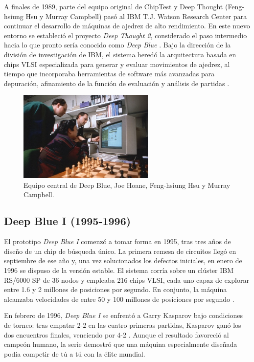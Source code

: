 \documentclass[a4paper, 12pt]{article}
\begin{document}
A finales de 1989, parte del equipo original de ChipTest y Deep 
Thought (Feng-hsiung Hsu y Murray Campbell) pasó al IBM T.J. 
Watson Research Center para continuar el desarrollo de máquinas 
de ajedrez de alto rendimiento. En este nuevo entorno se 
estableció el proyecto \textit{Deep Thought 2}, considerado el 
paso intermedio hacia lo que pronto sería conocido como 
\textit{Deep Blue} \cite{Campbell2002}. Bajo la dirección de la 
división de investigación de IBM, el sistema heredó la 
arquitectura basada en chips VLSI especializada para generar y 
evaluar movimientos de ajedrez, al tiempo que incorporaba 
herramientas de software más avanzadas para depuración, 
afinamiento de la función de evaluación y análisis de partidas 
\cite{Campbell2002}.

\begin{figure}[h]
    \centering
    \includegraphics[width=0.6\textwidth]{assets/Deep Blue's core team, Joe Hoane, Feng-hsiung Hsu, and Murray Campbell.jpg}
    \caption{Equipo central de Deep Blue, Joe Hoane, Feng-hsiung Hsu y Murray Campbell.}
    \label{fig:team}
\end{figure}


\subsection{Deep Blue I (1995-1996)}

El prototipo \textit{Deep Blue I} comenzó a tomar forma en 1995, 
tras tres años de diseño de un chip de búsqueda único. La 
primera remesa de circuitos llegó en septiembre de ese año y, 
una vez solucionados los defectos iniciales, en enero de 1996 se 
dispuso de la versión estable. El sistema corría sobre un 
clúster IBM RS/6000 SP de 36 nodos y empleaba 216 chips VLSI, 
cada uno capaz de explorar entre 1.6 y 2 millones de posiciones 
por segundo. En conjunto, la máquina alcanzaba velocidades de 
entre 50 y 100 millones de posiciones por segundo \cite{Campbell2002}.    

En febrero de 1996, \textit{Deep Blue I} se enfrentó a Garry 
Kasparov bajo condiciones de torneo: tras empatar 2-2 en las 
cuatro primeras partidas, Kasparov ganó los dos encuentros 
finales, venciendo por 4-2 \cite{Campbell2002}. Aunque el 
resultado favoreció al campeón humano, la serie demostró que una 
máquina especialmente diseñada podía competir de tú a tú con la 
élite mundial.
\end{document}
